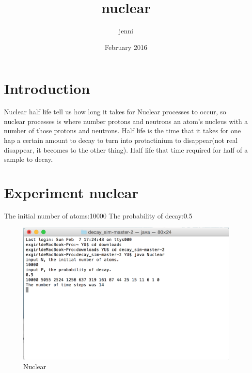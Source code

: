 \documentclass{article}
\title{nuclear}
\author{jenni }
\date{February 2016}
\begin{document}
\maketitle

\section{Introduction}
Nuclear half life tell us how long it takes for Nuclear processes to occur, so nuclear processes is where number protons and neutrons an atom's nucleus with a number of those protons and neutrons. Half life is the time that it takes for one hap a certain amount to decay to turn into protactinium to disappear(not real disappear, it becomes to the other thing). Half life that time required for half of a sample to decay.

\section{Experiment nuclear}
The initial number of atoms:10000
The probability of decay:0.5

\begin{figure}[h!]
\centering
\includegraphics{1.png}
\caption{Nuclear}
\label{fig:nuclear}
\end{figure}
\end{document}
